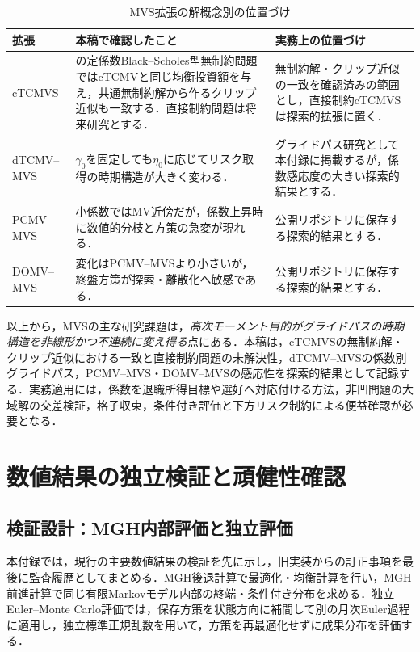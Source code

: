 \documentclass[10pt,a4paper]{article}
\theoremstyle{plain}
\theoremstyle{definition}
\begin{document}
\begin{table}[htbp]
\centering\small
\caption{MVS拡張の解概念別の位置づけ}
\label{tab:mvs-positioning}
\begin{tabularx}{\textwidth}{>{\raggedright\arraybackslash}p{25mm}>{\raggedright\arraybackslash}p{48mm}>{\raggedright\arraybackslash}X}
\toprule
拡張 & 本稿で確認したこと & 実務上の位置づけ \\
\midrule
cTCMVS
& \citet{MuTianYang2019}の定係数Black--Scholes型無制約問題ではcTCMVと同じ均衡投資額を与え，共通無制約解から作るクリップ近似も一致する．直接制約問題は将来研究とする．
& 無制約解・クリップ近似の一致を確認済みの範囲とし，直接制約cTCMVSは探索的拡張に置く．\\
dTCMV--MVS
& $\gamma_0$を固定しても$\eta_0$に応じてリスク取得の時期構造が大きく変わる．
& グライドパス研究として本付録に掲載するが，係数感応度の大きい探索的結果とする．\\
PCMV--MVS
& 小係数ではMV近傍だが，係数上昇時に数値的分枝と方策の急変が現れる．
& 公開リポジトリに保存する探索的結果とする．\\
DOMV--MVS
& 変化はPCMV--MVSより小さいが，終盤方策が探索・離散化へ敏感である．
& 公開リポジトリに保存する探索的結果とする．\\
\bottomrule
\end{tabularx}
\end{table}

以上から，MVSの主な研究課題は，\emph{高次モーメント目的がグライドパスの時期構造を非線形かつ不連続に変え得る}点にある．本稿は，cTCMVSの無制約解・クリップ近似における一致と直接制約問題の未解決性，dTCMV--MVSの係数別グライドパス，PCMV--MVS・DOMV--MVSの感応性を探索的結果として記録する．実務適用には，係数を退職所得目標や選好へ対応付ける方法，非凹問題の大域解の交差検証，格子収束，条件付き評価と下方リスク制約による便益確認が必要となる．

\clearpage
\section{数値結果の独立検証と頑健性確認}\label{app:corrections}
\subsection{検証設計：MGH内部評価と独立評価}\label{app:validation-design}
本付録では，現行の主要数値結果の検証を先に示し，旧実装からの訂正事項を最後に監査履歴としてまとめる．MGH後退計算で最適化・均衡計算を行い，MGH前進計算で同じ有限Markovモデル内部の終端・条件付き分布を求める．独立Euler--Monte Carlo評価では，保存方策を状態方向に補間して別の月次Euler過程に適用し，独立標準正規乱数を用いて，方策を再最適化せずに成果分布を評価する．
\end{document}

